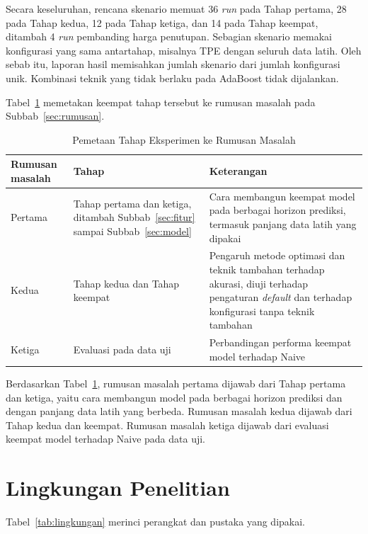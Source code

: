 Secara keseluruhan, rencana skenario memuat 36 \textit{run} pada Tahap
pertama, 28 pada Tahap kedua, 12 pada Tahap ketiga, dan 14 pada
Tahap keempat, ditambah 4 \textit{run} pembanding harga penutupan. Sebagian skenario memakai konfigurasi yang sama antartahap,
misalnya TPE dengan seluruh data latih. Oleh sebab itu, laporan hasil memisahkan
jumlah skenario dari jumlah konfigurasi unik. Kombinasi teknik yang tidak
berlaku pada AdaBoost tidak dijalankan.

Tabel~\ref{tab:petaRM} memetakan keempat tahap tersebut ke rumusan masalah
pada Subbab~\ref{sec:rumusan}.

\begin{table}[htbp]
  \caption{Pemetaan Tahap Eksperimen ke Rumusan Masalah}
  \label{tab:petaRM}
  \centering
  \begingroup
  \footnotesize
  \begin{tabular}{|>{\raggedright\arraybackslash}p{}%
                  |>{\raggedright\arraybackslash}p{}%
                  |>{\raggedright\arraybackslash}p{}|}
    \hline
    \textbf{Rumusan masalah} & \textbf{Tahap} & \textbf{Keterangan} \\
    \hline
    Pertama & Tahap pertama dan ketiga, ditambah Subbab~\ref{sec:fitur} sampai
    Subbab~\ref{sec:model} &
    Cara membangun keempat model pada berbagai horizon prediksi, termasuk
    panjang data latih yang dipakai \\
    \hline
    Kedua & Tahap kedua dan Tahap keempat &
    Pengaruh metode optimasi dan teknik tambahan terhadap akurasi,
    diuji terhadap pengaturan \textit{default} dan terhadap konfigurasi tanpa
    teknik tambahan \\
    \hline
    Ketiga & Evaluasi pada data uji &
    Perbandingan performa keempat model terhadap Naive \\
    \hline
  \end{tabular}
  \endgroup
\end{table}

Berdasarkan Tabel~\ref{tab:petaRM}, rumusan masalah pertama dijawab dari
Tahap pertama dan ketiga, yaitu cara membangun model pada berbagai horizon
prediksi dan dengan panjang data latih yang berbeda. Rumusan
masalah kedua dijawab dari Tahap kedua dan keempat. Rumusan masalah ketiga
dijawab dari evaluasi keempat model terhadap Naive pada data uji.

\section{Lingkungan Penelitian}
\label{sec:lingkungan}
Tabel~\ref{tab:lingkungan} merinci perangkat dan pustaka yang dipakai.


